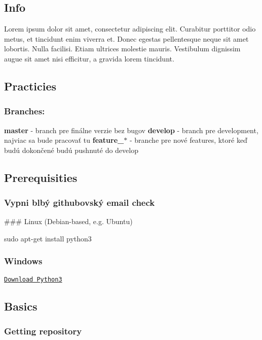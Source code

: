 \subsection*{Info}

Lorem ipsum dolor sit amet, consectetur adipiscing elit. Curabitur porttitor odio metus, et tincidunt enim viverra et. Donec egestas pellentesque neque sit amet lobortis. Nulla facilisi. Etiam ultrices molestie mauris. Vestibulum dignissim augue sit amet nisi efficitur, a gravida lorem tincidunt.

\subsection*{Practicies}

\subsubsection*{Branches\+:}

{\bfseries master} -\/ branch pre finálne verzie bez bugov {\bfseries develop} -\/ branch pre development, najviac sa bude pracovať tu {\bfseries feature\+\_\+$\ast$} -\/ branche pre nové features, ktoré keď budú dokončené budú pushnuté do develop

\subsection*{Prerequisities}

\subsubsection*{Vypni blbý githubovský email check}



\#\#\# Linux (Debian-\/based, e.\+g. Ubuntu) 
\begin{DoxyCode}
sudo apt-get install python3
\end{DoxyCode}
 \subsubsection*{Windows}

\href{https://www.python.org/downloads/}{\tt Download Python3} \subsection*{Basics}

\subsubsection*{Getting repository}

